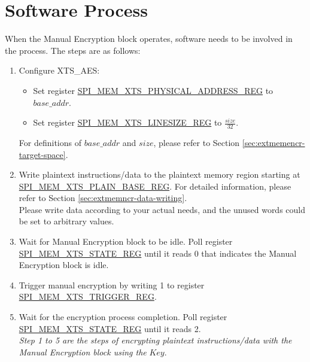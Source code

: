 \documentclass[main\_\_EN.tex]{subfiles}
\begin{document}
\section{ Software Process }

When the Manual Encryption block operates, software needs to be involved in the process. The steps are as follows:

\begin{enumerate}
    
    \item Configure XTS\_AES:
    \begin{itemize}
        \item Set register \hyperref[regdesc:SPIMEMXTSPHYSICALADDRESSREG]{SPI\_MEM\_XTS\_PHYSICAL\_ADDRESS\_REG} to \begin{math}base\_addr\end{math}.
        \item Set register \hyperref[regdesc:SPIMEMXTSLINESIZEREG]{SPI\_MEM\_XTS\_LINESIZE\_REG} to \begin{math}\frac{size}{32}\end{math}.
    \end{itemize}
    For definitions of \begin{math} base\_addr\end{math} and \begin{math}size\end{math}, please refer to Section \ref{sec:extmemencr-target-space}.
    
    \item Write plaintext instructions/data to the plaintext memory region starting at \hyperref[regdesc:SPIMEMXTSPLAINBASEREG]{SPI\_MEM\_XTS\_PLAIN\_BASE\_REG}. For detailed information, please refer to Section \ref{sec:extmemncr-data-writing}. \\Please write data according to your actual needs, and the unused words could be set to arbitrary values.
    
    \item Wait for Manual Encryption block to be idle. Poll register \hyperref[regdesc:SPIMEMXTSSTATEREG]{SPI\_MEM\_XTS\_STATE\_REG} until it reads 0 that indicates the Manual Encryption block is idle.
    
    \item Trigger manual encryption by writing 1 to register \hyperref[regdesc:SPIMEMXTSTRIGGERREG]{SPI\_MEM\_XTS\_TRIGGER\_REG}.
    
    \item Wait for the encryption process completion. Poll register \hyperref[regdesc:SPIMEMXTSSTATEREG]{SPI\_MEM\_XTS\_STATE\_REG} until it reads 2. \\ \textit{Step 1 to 5 are the steps of encrypting plaintext instructions/data with the Manual Encryption block using the} \begin{math}\mathit{Key}\end{math}.
    

\end{enumerate}
\end{document}
